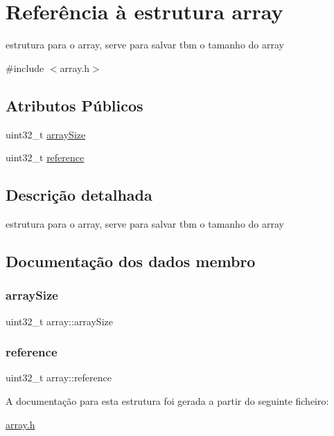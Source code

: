 \hypertarget{structarray}{}\section{Referência à estrutura array}
\label{structarray}


estrutura para o array, serve para salvar tbm o tamanho do array  




{\ttfamily \#include $<$array.\+h$>$}

\subsection*{Atributos Públicos}
\begin{DoxyCompactItemize}
\item 
uint32\+\_\+t \hyperlink{structarray_a37b6bcc87d0ba4ed993b40cbb64dac0c}{array\+Size}
\item 
uint32\+\_\+t \hyperlink{structarray_a9f6062e2b3af92c277365a823f7d2491}{reference}
\end{DoxyCompactItemize}


\subsection{Descrição detalhada}
estrutura para o array, serve para salvar tbm o tamanho do array 

\subsection{Documentação dos dados membro}
\hypertarget{structarray_a37b6bcc87d0ba4ed993b40cbb64dac0c}{}\label{structarray_a37b6bcc87d0ba4ed993b40cbb64dac0c} 
\subsubsection{\texorpdfstring{array\+Size}{arraySize}}
{\footnotesize\ttfamily uint32\+\_\+t array\+::array\+Size}

\hypertarget{structarray_a9f6062e2b3af92c277365a823f7d2491}{}\label{structarray_a9f6062e2b3af92c277365a823f7d2491} 
\subsubsection{\texorpdfstring{reference}{reference}}
{\footnotesize\ttfamily uint32\+\_\+t array\+::reference}



A documentação para esta estrutura foi gerada a partir do seguinte ficheiro\+:\begin{DoxyCompactItemize}
\item 
\hyperlink{array_8h}{array.\+h}\end{DoxyCompactItemize}
